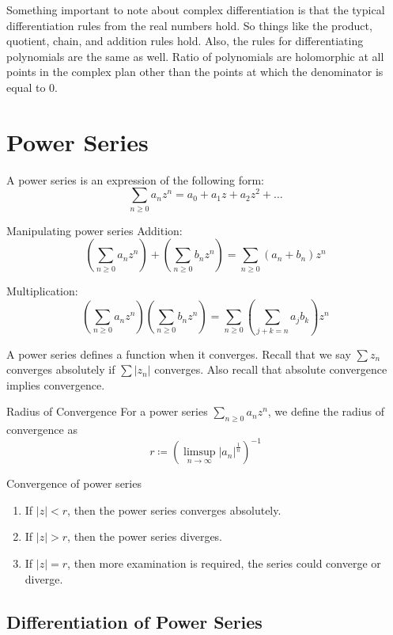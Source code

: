\documentclass{article}
\begin{document}
        Something important to note about complex differentiation is that the typical differentiation rules from the real numbers hold. So things like the product, quotient, chain, and addition rules hold. Also, the rules for differentiating polynomials are the same as well. Ratio of polynomials are holomorphic at all points in the complex plan other than the points at which the denominator is equal to \( 0 \).

\section{Power Series}

A power series is an expression of the following form:
\[
    \sum_{n\geq 0} a_{n} z^n = a_{0} + a_{1}z + a_2 z^{2} + \dots   
\]

\begin{rmk}{Manipulating power series}{}
Addition:
\[
    (\sum_{n\geq 0} a_{n} z^n )+(\sum_{n \geq 0} b_{n} z^n) = \sum_{n\geq 0} (a_{n} + b_{n} )z^n 
\]

Multiplication:
\[
    (\sum_{n\geq 0}a_{n} z^n )(\sum_{n\geq 0} b_{n} z^n ) = \sum_{n\geq 0}(\sum_{j + k = n}a_{j} b_{k}  )z^n 
\]
\end{rmk}


A power series defines a function when it converges. Recall that we say \( \sum z_{n}   \) converges absolutely if \( \sum |z_{n} | \) converges. Also recall that absolute convergence implies convergence.

\begin{defn}{Radius of Convergence}{}
   For a power series \( \sum_{n\geq 0}  a_{n} z^n\), we define the radius of convergence as 
   \[
       r\coloneqq (\limsup_{n \to \infty} |a_{n} |^\frac{1}{n})^{-1} 
   \]
   \end{defn}
\begin{thrm}{Convergence of power series}{}
    \begin{enumerate}[]
        \item If \( |z| < r \), then the power series converges absolutely.
        \item If \( |z| >r \), then the power series diverges. 
        \item If \( |z| = r \), then more examination is required, the series could converge or diverge. 
    \end{enumerate}
\end{thrm}


\subsection{Differentiation of Power Series}
\end{document}
